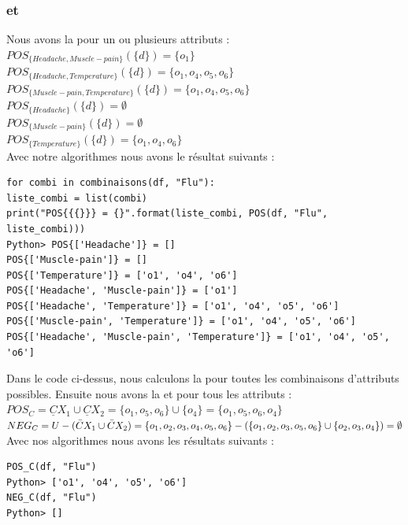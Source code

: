 \subsubsection{\posreg et \negreg}
Nous avons la \posreg pour un ou plusieurs attributs : \\
$POS_{\{Headache, Muscle-pain\}}(\{d\}) = \{o_1\}$ \\
$POS_{\{Headache, Temperature\}}(\{d\}) = \{o_1, o_4, o_5, o_6\}$ \\
$POS_{\{Muscle-pain, Temperature\}}(\{d\}) = \{o_1, o_4, o_5, o_6\}$ \\
$POS_{\{Headache\}}(\{d\}) = \emptyset $ \\
$POS_{\{Muscle-pain\}}(\{d\}) = \emptyset $ \\
$POS_{\{Temperature\}}(\{d\}) = \{o_1, o_4, o_6\}$ \\
Avec notre algorithmes nous avons le résultat suivants :
\begin{lstlisting}
for combi in combinaisons(df, "Flu"):
liste_combi = list(combi)
print("POS{{{}}} = {}".format(liste_combi, POS(df, "Flu", liste_combi)))
Python> POS{['Headache']} = []
POS{['Muscle-pain']} = []
POS{['Temperature']} = ['o1', 'o4', 'o6']
POS{['Headache', 'Muscle-pain']} = ['o1']
POS{['Headache', 'Temperature']} = ['o1', 'o4', 'o5', 'o6']
POS{['Muscle-pain', 'Temperature']} = ['o1', 'o4', 'o5', 'o6']
POS{['Headache', 'Muscle-pain', 'Temperature']} = ['o1', 'o4', 'o5', 'o6']
\end{lstlisting}
Dans le code ci-dessus, nous calculons la \posreg pour
toutes les combinaisons d'attributs possibles.
Ensuite nous avons la \posreg et \negreg pour tous les
attributs : \\
$POS_C = \underline{C}X_1 \cup \underline{C}X_2
	= \{o_1, o_5, o_6\} \cup \{o_4\}
	= \{o_1, o_5, o_6, o_4\}$ \\
$NEG_C = U - (\Bar{C}X_1 \cup \Bar{C}X_2)
	= \{o_1, o_2, o_3, o_4, o_5, o_6\} - (\{o_1, o_2, o_3,
	o_5, o_6\} \cup \{o_2, o_3, o_4\})
	= \emptyset $ \\
Avec nos algorithmes nous avons les résultats suivants :
\begin{lstlisting}
POS_C(df, "Flu")
Python> ['o1', 'o4', 'o5', 'o6']
NEG_C(df, "Flu")
Python> []
\end{lstlisting}
